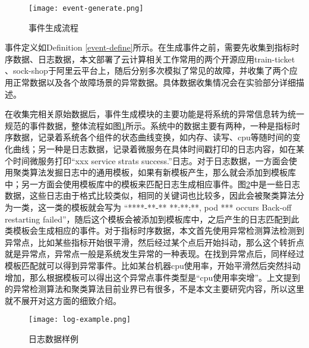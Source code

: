\begin{figure}[htbp]
    \centering
    \texttt{[image: event-generate.png]}
    \caption{事件生成流程\label{event-generate}}
\end{figure}

事件定义如Definition \ref{event-define}所示。在生成事件之前，需要先收集到指标时序数据、日志数据，本文部署了云计算相关工作常用的两个开源应用train-ticket\cite{zhou2018poster} 、sock-shop\cite{rahman2019predicting}于阿里云平台上，随后分别多次模拟了常见的故障，并收集了两个应用正常数据以及各个故障场景的异常数据。具体数据收集情况会在实验部分详细描述。

在收集完相关原始数据后，事件生成模块的主要功能是将系统的异常信息转为统一规范的事件数据，整体流程如图\ref{event-generate}所示。系统中的数据主要有两种，一种是指标时序数据，记录着系统各个组件的状态曲线变换，如内存、读写、cpu等随时间的变化曲线；另一种是日志数据，记录着微服务在具体时间戳打印的日志内容，如在某个时间微服务打印“xxx service strats success.”日志。对于日志数据，一方面会使用聚类算法发掘日志中的通用模板，如果有新模板产生，那么就会添加到模板库中；另一方面会使用模板库中的模板来匹配日志生成相应事件。图\ref{log-example}中是一些日志数据，这些日志由于格式比较类似，相同的关键词也比较多，因此会被聚类算法分为一类，这一类的模板就会写为 “****-**-** **:**:**, pod *** occurs Back-off restarting failed”，随后这个模板会被添加到模板库中，之后产生的日志匹配到此类模板会生成相应的事件。对于指标时序数据，本文首先使用异常检测算法检测到异常点，比如某些指标开始很平滑，然后经过某个点后开始抖动，那么这个转折点就是异常点，异常点一般是系统发生异常的一种表现。在找到异常点后，同样经过模板匹配就可以得到异常事件。比如某台机器cpu使用率，开始平滑然后突然抖动增加，那么根据模板可以得出这个异常点事件类型是“cpu使用率突增”。上文提到的异常检测算法\cite{yang2019integrated}和聚类算法\cite{landauer2020system}目前业界已有很多，不是本文主要研究内容，所以这里就不展开对这方面的细致介绍。

\begin{figure}[htbp]
    \centering
    \texttt{[image: log-example.png]}
    \caption{日志数据样例\label{log-example}}
\end{figure}

